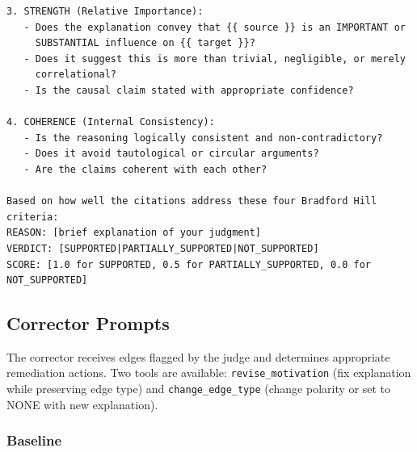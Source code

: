 \begin{lstlisting}[caption={Citation Judge: Mechanistic-Lit Prompt},label={lst:citation_mechanistic_lit}]
3. STRENGTH (Relative Importance):
   - Does the explanation convey that {{ source }} is an IMPORTANT or 
     SUBSTANTIAL influence on {{ target }}?
   - Does it suggest this is more than trivial, negligible, or merely 
     correlational?
   - Is the causal claim stated with appropriate confidence?

4. COHERENCE (Internal Consistency):
   - Is the reasoning logically consistent and non-contradictory?
   - Does it avoid tautological or circular arguments?
   - Are the claims coherent with each other?

Based on how well the citations address these four Bradford Hill criteria:
REASON: [brief explanation of your judgment]
VERDICT: [SUPPORTED|PARTIALLY_SUPPORTED|NOT_SUPPORTED]
SCORE: [1.0 for SUPPORTED, 0.5 for PARTIALLY_SUPPORTED, 0.0 for NOT_SUPPORTED]
\end{lstlisting}

\subsection{Corrector Prompts}
\label{sec:corrector_prompts}

The corrector receives edges flagged by the judge and determines appropriate remediation actions. Two tools are available: \texttt{revise\_motivation} (fix explanation while preserving edge type) and \texttt{change\_edge\_type} (change polarity or set to NONE with new explanation).

\subsubsection{Baseline}

